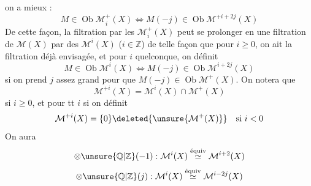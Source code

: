 on a mieux :
\[
M\in\operatorname{Ob}\mathcal{M}_i^+(X)\Longleftrightarrow
M(-j)\in\operatorname{Ob}\mathcal{M}^{+i+2j}(X)
\]
De cette façon, la filtration  par les
$\mathcal{M}_i^+(X)$  peut se prolonger en une filtration
de $\mathcal{M}(X)$ par des $\mathcal{M}^i(X)$ ($i\in\mathbb{Z}$) de
telle façon que pour $i\geq0$, on ait la filtration
déjà  envisagée, et pour $i$ quelconque,
on définit
\[
M\in\operatorname{Ob}\mathcal{M}^i(X)\Longleftrightarrow
M(-j)\in\operatorname{Ob}\mathcal{M}^{i+2j}(X)
\]
si on prend $j$ assez grand pour que
$M(-j)\in\operatorname{Ob}\mathcal{M}^+(X)$. On notera que
\[
\mathcal{M}^{+i}(X)=\mathcal{M}^i(X)\cap \mathcal{M}^+(X)
\]
si $i\geq0$, et pour tt $i$ si on définit
\[
\mathcal{M}^{+i}(X)=\{0\}\deleted{\unsure{\mathcal{M}^+(X)}}\quad\text{si }i<0
\]
On aura
\[
\otimes\unsure{\mathbb{Q}|\mathbb{Z}}(-1):
\mathcal{M}^i(X)\overset{\text{équiv}}{\simeq}\mathcal{M}^{i+2}(X)
\]
\[
\otimes\unsure{\mathbb{Q}|\mathbb{Z}}(j):
\mathcal{M}^i(X)\overset{\text{équiv}}{\simeq}\mathcal{M}^{i-2j}(X)
\]
